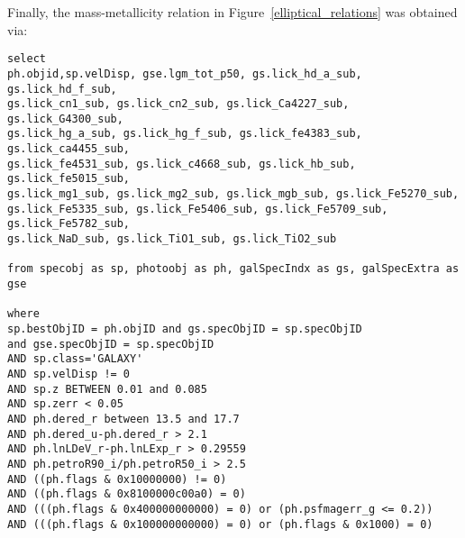 \documentclass{emulateapj}
\begin{document}
Finally, the mass-metallicity relation in Figure~\ref{elliptical_relations} was obtained via:
\begin{verbatim}
select 
ph.objid,sp.velDisp, gse.lgm_tot_p50, gs.lick_hd_a_sub, gs.lick_hd_f_sub, 
gs.lick_cn1_sub, gs.lick_cn2_sub, gs.lick_Ca4227_sub, gs.lick_G4300_sub, 
gs.lick_hg_a_sub, gs.lick_hg_f_sub, gs.lick_fe4383_sub, gs.lick_ca4455_sub, 
gs.lick_fe4531_sub, gs.lick_c4668_sub, gs.lick_hb_sub, gs.lick_fe5015_sub, 
gs.lick_mg1_sub, gs.lick_mg2_sub, gs.lick_mgb_sub, gs.lick_Fe5270_sub, 
gs.lick_Fe5335_sub, gs.lick_Fe5406_sub, gs.lick_Fe5709_sub, gs.lick_Fe5782_sub, 
gs.lick_NaD_sub, gs.lick_TiO1_sub, gs.lick_TiO2_sub 

from specobj as sp, photoobj as ph, galSpecIndx as gs, galSpecExtra as gse

where
sp.bestObjID = ph.objID and gs.specObjID = sp.specObjID 
and gse.specObjID = sp.specObjID
AND sp.class='GALAXY'
AND sp.velDisp != 0
AND sp.z BETWEEN 0.01 and 0.085
AND sp.zerr < 0.05
AND ph.dered_r between 13.5 and 17.7
AND ph.dered_u-ph.dered_r > 2.1
AND ph.lnLDeV_r-ph.lnLExp_r > 0.29559
AND ph.petroR90_i/ph.petroR50_i > 2.5
AND ((ph.flags & 0x10000000) != 0)
AND ((ph.flags & 0x8100000c00a0) = 0)
AND (((ph.flags & 0x400000000000) = 0) or (ph.psfmagerr_g <= 0.2))
AND (((ph.flags & 0x100000000000) = 0) or (ph.flags & 0x1000) = 0)
\end{verbatim}
\end{document}
